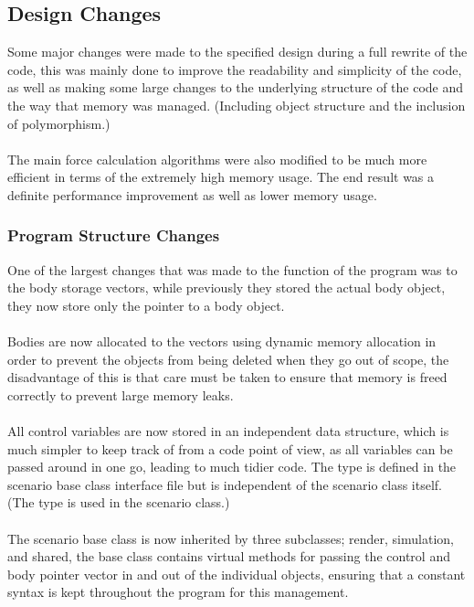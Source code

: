 \subsection{Design Changes}
Some major changes were made to the specified design during a full rewrite of the code, this was mainly done to improve the readability and simplicity of the code, as well as making some large changes to the underlying structure of the code and the way that memory was managed. (Including object structure and the inclusion of polymorphism.)

\paragraph{}
The main force calculation algorithms were also modified to be much more efficient in terms of the extremely high memory usage. The end result was a definite performance improvement as well as lower memory usage.

\subsubsection{Program Structure Changes}
One of the largest changes that was made to the function of the program was to the body storage vectors, while previously they stored the actual body object, they now store only the pointer to a body object.

\paragraph{}
Bodies are now allocated to the vectors using dynamic memory allocation in order to prevent the objects from being deleted when they go out of scope, the disadvantage of this is that care must be taken to ensure that memory is freed correctly to prevent large memory leaks.

\paragraph{}
All control variables are now stored in an independent data structure, which is much simpler to keep track of from a code point of view, as all variables can be passed around in one go, leading to much tidier code. The type is defined in the scenario base class interface file but is independent of the scenario class itself. (The type is used in the scenario class.)

\paragraph{}
The scenario base class is now inherited by three subclasses; render, simulation, and shared, the base class contains virtual methods for passing the control and body pointer vector in and out of the individual objects, ensuring that a constant syntax is kept throughout the program for this management.

